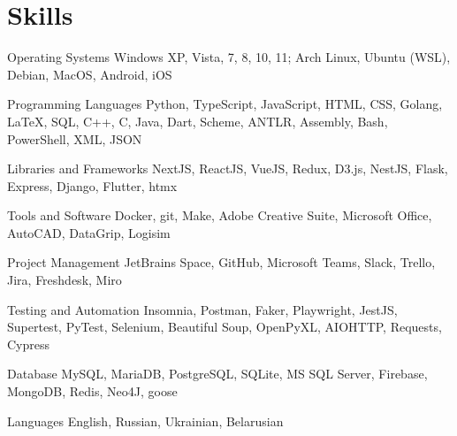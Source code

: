 \section{Skills}

\cvitem
    {Operating Systems}
    {%
        Windows XP, Vista, 7, 8, 10, 11; Arch Linux, Ubuntu (WSL), Debian,
        MacOS, Android, iOS%
    }

\cvitem
    {Programming Languages}
    {%
        Python, TypeScript, JavaScript, HTML, CSS, Golang, \LaTeX, SQL, C++, C,
        Java, Dart, Scheme, ANTLR, Assembly, Bash, PowerShell, XML, JSON%
    }

\cvitem
    {Libraries and Frameworks}
    {%
        NextJS, ReactJS, VueJS, Redux, D3.js, NestJS, Flask, Express, Django,
        Flutter, htmx%
    }

\cvitem
    {Tools and Software}
    {%
        Docker, git, Make, Adobe Creative Suite, Microsoft Office, AutoCAD,
        DataGrip, Logisim%
    }

\cvitem
    {Project Management}
    {%
        JetBrains Space, GitHub, Microsoft Teams, Slack, Trello, Jira,
        Freshdesk, Miro%
    }

\cvitem
    {Testing and Automation}
    {%
        Insomnia, Postman, Faker, Playwright, JestJS, Supertest, PyTest,
        Selenium, Beautiful Soup, OpenPyXL, AIOHTTP, Requests, Cypress%
    }

\cvitem
    {Database}
    {%
        MySQL, MariaDB, PostgreSQL, SQLite, MS SQL Server, Firebase, MongoDB,
        Redis, Neo4J, goose%
    }

\cvitem
    {Languages}
    {English, Russian, Ukrainian, Belarusian}